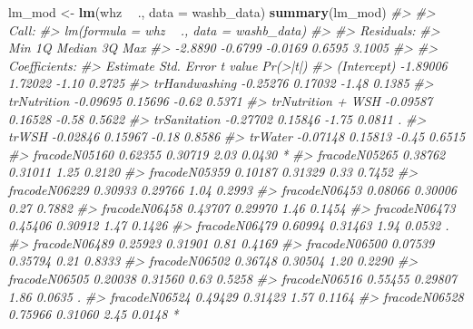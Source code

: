 \documentclass[12pt, krantz2,]{krantz}
\newenvironment{Shaded}{\begin{snugshade}}{\end{snugshade}}
\newcommand{\CommentTok}[1]{\textcolor[rgb]{0.37,0.37,0.37}{\textit{#1}}}
\newcommand{\DataTypeTok}[1]{\textcolor[rgb]{0.27,0.27,0.27}{#1}}
\newcommand{\KeywordTok}[1]{\textcolor[rgb]{0.27,0.27,0.27}{\textbf{#1}}}
\newcommand{\NormalTok}[1]{#1}
\newcommand{\OperatorTok}[1]{\textcolor[rgb]{0.43,0.43,0.43}{\textbf{#1}}}
\newcommand{\StringTok}[1]{\textcolor[rgb]{0.5,0.5,0.5}{#1}}
\theoremstyle{definition}
\theoremstyle{definition}
\theoremstyle{definition}
\newcommand{\1}{\mathbbm{1}}
\begin{document}
\begin{Shaded}
\begin{Highlighting}[]
\NormalTok{lm_mod <-}\StringTok{ }\KeywordTok{lm}\NormalTok{(whz }\OperatorTok{~}\StringTok{ }\NormalTok{., }\DataTypeTok{data =}\NormalTok{ washb_data)}
\KeywordTok{summary}\NormalTok{(lm_mod)}
\CommentTok{#> }
\CommentTok{#> Call:}
\CommentTok{#> lm(formula = whz ~ ., data = washb_data)}
\CommentTok{#> }
\CommentTok{#> Residuals:}
\CommentTok{#>     Min      1Q  Median      3Q     Max }
\CommentTok{#> -2.8890 -0.6799 -0.0169  0.6595  3.1005 }
\CommentTok{#> }
\CommentTok{#> Coefficients:}
\CommentTok{#>                                 Estimate Std. Error t value Pr(>|t|)   }
\CommentTok{#> (Intercept)                     -1.89006    1.72022   -1.10   0.2725   }
\CommentTok{#> trHandwashing                   -0.25276    0.17032   -1.48   0.1385   }
\CommentTok{#> trNutrition                     -0.09695    0.15696   -0.62   0.5371   }
\CommentTok{#> trNutrition + WSH               -0.09587    0.16528   -0.58   0.5622   }
\CommentTok{#> trSanitation                    -0.27702    0.15846   -1.75   0.0811 . }
\CommentTok{#> trWSH                           -0.02846    0.15967   -0.18   0.8586   }
\CommentTok{#> trWater                         -0.07148    0.15813   -0.45   0.6515   }
\CommentTok{#> fracodeN05160                    0.62355    0.30719    2.03   0.0430 * }
\CommentTok{#> fracodeN05265                    0.38762    0.31011    1.25   0.2120   }
\CommentTok{#> fracodeN05359                    0.10187    0.31329    0.33   0.7452   }
\CommentTok{#> fracodeN06229                    0.30933    0.29766    1.04   0.2993   }
\CommentTok{#> fracodeN06453                    0.08066    0.30006    0.27   0.7882   }
\CommentTok{#> fracodeN06458                    0.43707    0.29970    1.46   0.1454   }
\CommentTok{#> fracodeN06473                    0.45406    0.30912    1.47   0.1426   }
\CommentTok{#> fracodeN06479                    0.60994    0.31463    1.94   0.0532 . }
\CommentTok{#> fracodeN06489                    0.25923    0.31901    0.81   0.4169   }
\CommentTok{#> fracodeN06500                    0.07539    0.35794    0.21   0.8333   }
\CommentTok{#> fracodeN06502                    0.36748    0.30504    1.20   0.2290   }
\CommentTok{#> fracodeN06505                    0.20038    0.31560    0.63   0.5258   }
\CommentTok{#> fracodeN06516                    0.55455    0.29807    1.86   0.0635 . }
\CommentTok{#> fracodeN06524                    0.49429    0.31423    1.57   0.1164   }
\CommentTok{#> fracodeN06528                    0.75966    0.31060    2.45   0.0148 * }

\end{Highlighting}
\end{Shaded}
\end{document}

